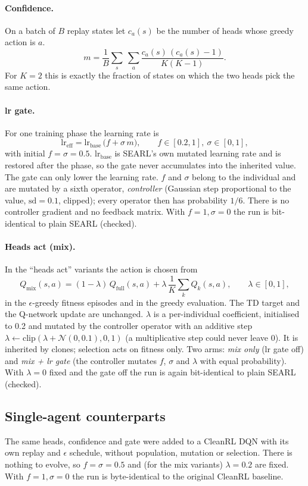 \documentclass[11pt]{article}
\newcommand{\Qfull}{Q_{\mathrm{full}}}
\newcommand{\Qmix}{Q_{\mathrm{mix}}}
\begin{document}
\paragraph{Confidence.} On a batch of $B$ replay states let $c_a(s)$ be the number of heads whose greedy action is $a$.
\[
  m = \frac{1}{B}\sum_{s}\ \sum_{a} \frac{c_a(s)\,(c_a(s)-1)}{K(K-1)} .
\]
For $K=2$ this is exactly the fraction of states on which the two heads pick the same action.

\paragraph{lr gate.} For one training phase the learning rate is
\[
  \mathrm{lr}_{\mathrm{eff}} = \mathrm{lr}_{\mathrm{base}}\,\bigl(f + \sigma\, m\bigr), \qquad f\in[0.2,1],\ \sigma\in[0,1],
\]
with initial $f=\sigma=0.5$. $\mathrm{lr}_{\mathrm{base}}$ is SEARL's own mutated learning rate and is restored after the
phase, so the gate never accumulates into the inherited value. The gate can only lower the learning rate. $f$ and $\sigma$
belong to the individual and are mutated by a sixth operator, \emph{controller} (Gaussian step proportional to the value,
$\mathrm{sd}=0.1$, clipped); every operator then has probability $1/6$. There is no controller gradient and no
feedback matrix. With $f=1,\sigma=0$ the run is bit-identical to plain SEARL (checked).

\paragraph{Heads act (mix).} In the ``heads act'' variants the action is chosen from
\[
  \Qmix(s,a) = (1-\lambda)\,\Qfull(s,a) + \lambda\,\frac{1}{K}\sum_{k} Q_k(s,a),\qquad \lambda\in[0,1],
\]
in the $\epsilon$-greedy fitness episodes and in the greedy evaluation. The TD target and the Q-network update are unchanged.
$\lambda$ is a per-individual coefficient, initialised to 0.2 and mutated by the controller operator with an
additive step $\lambda \leftarrow \mathrm{clip}(\lambda + \mathcal N(0, 0.1),0,1)$ (a multiplicative step could never
leave 0). It is inherited by clones; selection acts on fitness only. Two arms: \emph{mix only} (lr gate off) and
\emph{mix + lr gate} (the controller mutates $f$, $\sigma$ and $\lambda$ with equal probability). With $\lambda=0$ fixed
and the gate off the run is again bit-identical to plain SEARL (checked).

\subsection{Single-agent counterparts}
The same heads, confidence and gate were added to a CleanRL DQN with its own replay and $\epsilon$ schedule, without
population, mutation or selection. There is nothing to evolve, so $f=\sigma=0.5$ and (for the mix variants)
$\lambda = 0.2$ are fixed. With $f=1,\sigma=0$ the run is byte-identical to the original CleanRL baseline.
\end{document}
